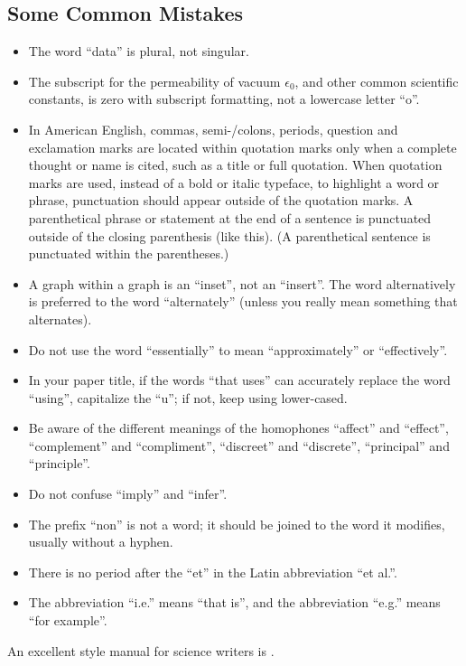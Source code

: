 \documentclass{MIPRO}
\begin{document}
\subsection{Some Common Mistakes}

\begin{itemize}
    \item The word “data” is plural, not singular.
    \item The subscript for the permeability of vacuum $\epsilon_0$, and other common scientific constants, is zero with subscript formatting, not a lowercase letter “o”.
    \item In American English, commas, semi-/colons, periods, question and exclamation marks are located within quotation marks only when a complete thought or name is cited, such as a title or full quotation. When quotation marks are used, instead of a bold or italic typeface, to highlight a word or phrase, punctuation should appear outside of the quotation marks. A parenthetical phrase or statement at the end of a sentence is punctuated outside of the closing parenthesis (like this). (A parenthetical sentence is punctuated within the parentheses.)
    \item A graph within a graph is an “inset”, not an “insert”. The word alternatively is preferred to the word “alternately” (unless you really mean something that alternates).
    \item Do not use the word “essentially” to mean “approximately” or “effectively”.
    \item In your paper title, if the words “that uses” can accurately replace the word “using”, capitalize the “u”; if not, keep using lower-cased.
    \item Be aware of the different meanings of the homophones “affect” and “effect”, “complement” and “compliment”, “discreet” and “discrete”, “principal” and “principle”.
    \item Do not confuse “imply” and “infer”.
    \item The prefix “non” is not a word; it should be joined to the word it modifies, usually without a hyphen.
    \item There is no period after the “et” in the Latin abbreviation “et al.”.
    \item The abbreviation “i.e.” means “that is”, and the abbreviation “e.g.” means “for example”.
\end{itemize}

An excellent style manual for science writers is \cite{young2002technical}.
\end{document}
